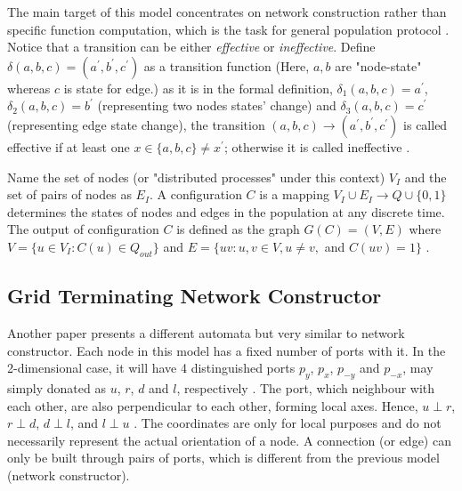 \par\noindent
The main target of this model concentrates on network construction rather than
specific function computation, which is the task for general population protocol \cite{MS16a}. Notice that a transition can be either \textit{effective}
or \textit{ineffective}. Define $\delta(a, b, c) = (a^{'}, b^{'},c^{'})$ as a transition function (Here, $a, b$ are "node-state" whereas $c$ is state for edge.)
as it is in the formal definition, $\delta_{1}(a,b,c) = a^{'}$, $\delta_{2}(a,b,c) = b^{'}$ (representing two nodes states' change)
and $\delta_{3}(a,b,c) = c^{'}$ (representing edge state change), the transition $(a,b,c) \to (a^{'}, b^{'},c^{'})$ is called
effective if at least one $x \in \{a,b,c\} \not= x^{'} $; otherwise it is called ineffective \cite{MS16a}.


\par\noindent
Name the set of nodes (or "distributed processes" under this context) $V_{I}$ and the set of pairs of nodes as $E_{I}$.
A configuration $C$ is a mapping $ V_{I} \cup E_{I} \to Q \cup \{0,1\} $ determines the states of nodes and edges in the population at any discrete time.
The output of configuration $C$ is defined as the graph $G(C) = (V, E) $ where $V = \{u \in V_{I}: C(u) \in Q_{out}\}$
and  $E = \{uv: u, v \in V, u \not= v,$ and $C(uv) = 1\}$ \cite{MS16a}.

\subsection{Grid Terminating Network Constructor \cite{Mi17} \label{IntroToGrid}}

\par\noindent
Another paper \cite{Mi17} presents a different automata but very similar to network constructor. Each node in this
model has a fixed number of ports with it. In the 2-dimensional case, it will have 4 distinguished ports
$p_{y}$, $p_{x}$, $p_{-y}$ and $p_{-x}$, may simply donated as $u$, $r$, $d$ and $l$, respectively \cite{Mi17} .
The port, which neighbour with each other, are also perpendicular to each other, forming local axes. Hence,
$ u \perp r $, $ r \perp d $, $ d \perp l $, and  $ l \perp u $ \cite{Mi17} . The coordinates are only for local purposes and
do not necessarily represent the actual orientation of a node. A connection (or edge) can only be built through
pairs of ports, which is different from the previous model (network constructor).



